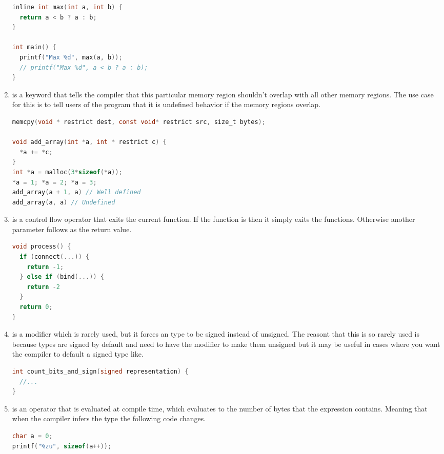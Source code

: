 \begin{enumerate}
\begin{lstlisting}[language=C]
inline int max(int a, int b) {
  return a < b ? a : b;
}

int main() {
  printf("Max %d", max(a, b));
  // printf("Max %d", a < b ? a : b);
}
\end{lstlisting}

\item {} is a keyword that tells the compiler that this particular memory region shouldn't overlap with all other memory regions. The use case for this is to tell users of the program that it is undefined behavior if the memory regions overlap.

\begin{lstlisting}[language=C]
memcpy(void * restrict dest, const void* restrict src, size_t bytes);

void add_array(int *a, int * restrict c) {
  *a += *c;
}
int *a = malloc(3*sizeof(*a));
*a = 1; *a = 2; *a = 3;
add_array(a + 1, a) // Well defined
add_array(a, a) // Undefined
\end{lstlisting}
\item {} is a control flow operator that exits the current function. If the function is  then it simply exits the functions. Otherwise another parameter follows as the return value.

\begin{lstlisting}[language=C]
void process() {
  if (connect(...)) {
    return -1;
  } else if (bind(...)) {
    return -2
  }
  return 0;
}
\end{lstlisting}

\item {} is a modifier which is rarely used, but it forces an type to be signed instead of unsigned. The reasont that this is so rarely used is because types are signed by default and need to have the  modifier to make them unsigned but it may be useful in cases where you want the compiler to default a signed type like.

\begin{lstlisting}[language=C]
int count_bits_and_sign(signed representation) {
  //...
}
\end{lstlisting}
\item {} is an operator that is evaluated at compile time, which evaluates to the number of bytes that the expression contains. Meaning that when the compiler infers the type the following code changes.
\begin{lstlisting}[language=C]
char a = 0;
printf("%zu", sizeof(a++));
\end{lstlisting}


\end{enumerate}
